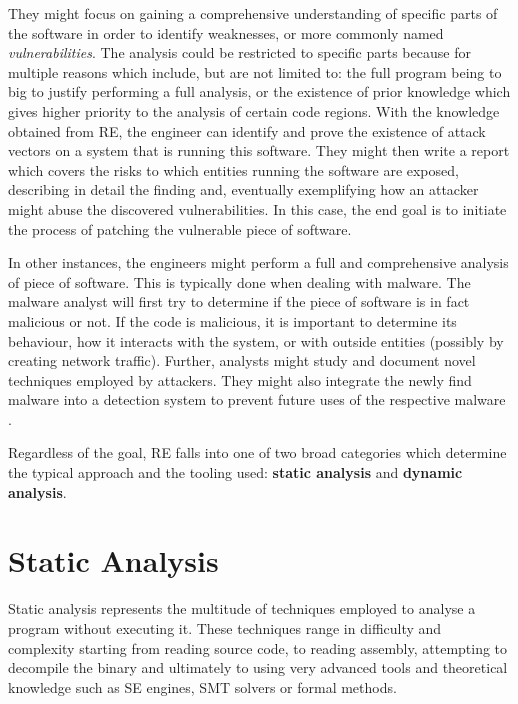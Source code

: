 They might focus on gaining a comprehensive understanding of specific parts of the software in order to identify weaknesses, or more commonly named \emph{vulnerabilities}. The analysis could be restricted to specific parts because for multiple reasons which include, but are not limited to: the full program being to big to justify performing a full analysis, or the existence of prior knowledge which gives higher priority to the analysis of certain code regions. With the knowledge obtained from RE, the engineer can identify and prove the existence of attack vectors on a system that is running this software. They might then write a report which covers the risks to which entities running the software are exposed, describing in detail the finding and, eventually exemplifying how an attacker might abuse the discovered vulnerabilities. In this case, the end goal is to initiate the process of patching the vulnerable piece of software. %

In other instances, the engineers might perform a full and comprehensive analysis of piece of software. This is typically done when dealing with malware. The malware analyst will first try to determine if the piece of software is in fact malicious or not. If the code is malicious, it is important to determine its behaviour, how it interacts with the system, or with outside entities (possibly by creating network traffic). Further, analysts might study and document novel techniques employed by attackers. They might also integrate the newly find malware into a detection system to prevent future uses of the respective malware \cite{malware_crowdstrike}.

Regardless of the goal, RE falls into one of two broad categories which determine the typical approach and the tooling used: \textbf{static analysis} and \textbf{dynamic analysis}.

\section{Static Analysis}

Static analysis represents the multitude of techniques employed to analyse a program without executing it. These techniques range in difficulty and complexity starting from reading source code, to reading assembly, attempting to decompile the binary and ultimately to using very advanced tools and theoretical knowledge such as \gls{SE} engines, SMT solvers or formal methods. %

